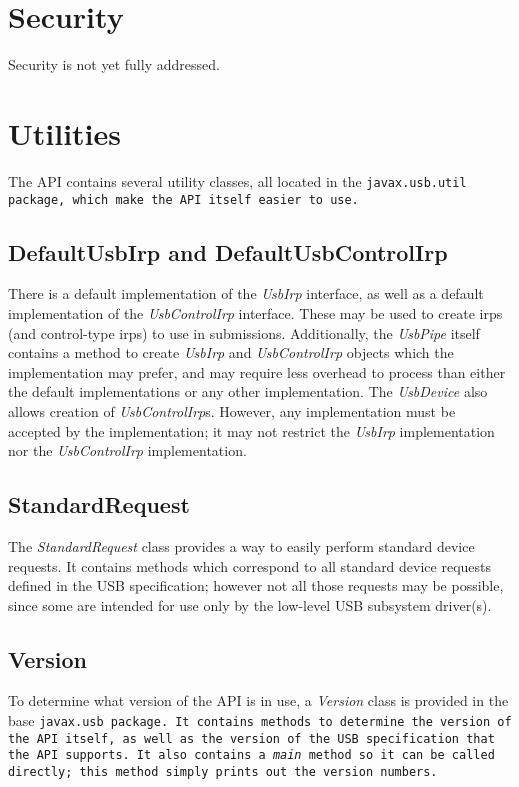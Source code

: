 \documentclass{article}
\newcommand{\myclass}[1]{\emph{#1}}
\newcommand{\myinterface}[1]{\emph{#1}}
\newcommand{\mypackage}[1]{\tt#1\rm}
\newcommand{\mymethod}[1]{\emph{#1}}
\newcommand{\mysectionend}[0]{\vfill\pagebreak[1]}
\begin{document}
%

\section{Security}

Security is not yet fully addressed.

\mysectionend

%

\section{Utilities}

The API contains several utility classes, all located in the \mypackage{javax.usb.util}
package, which make the API itself easier to use.

\subsection{DefaultUsbIrp and DefaultUsbControlIrp}

There is a default implementation of the \myinterface{UsbIrp} interface, as well as a default
implementation of the \myinterface{UsbControlIrp} interface.  These may be used to create irps
(and control-type irps) to use in submissions.  Additionally, the \myinterface{UsbPipe} itself
contains a method to create \myinterface{UsbIrp} and \myinterface{UsbControlIrp} objects which
the implementation may prefer, and may require less overhead to process than either the default
implementations or any other implementation.  The \myinterface{UsbDevice} also allows creation of
\myinterface{UsbControlIrp}s.  However, any implementation must be accepted by the implementation;
it may not restrict the \myinterface{UsbIrp} implementation nor the \myinterface{UsbControlIrp}
implementation.

\subsection{StandardRequest}

The \myclass{StandardRequest} class provides a way to easily perform standard device requests.
It contains methods which correspond to all standard device requests defined in the USB
specification; however not all those requests may be possible, since some are intended for
use only by the low-level USB subsystem driver(s).

\subsection{Version}

To determine what version of the API is in use, a \myclass{Version} class is
provided in the base \mypackage{javax.usb} package.  It contains methods to determine
the version of the API itself, as well as the version of the USB specification
that the API supports.  It also contains a \mymethod{main} method so it can
be called directly; this method simply prints out the version numbers.

\mysectionend
\end{document}
